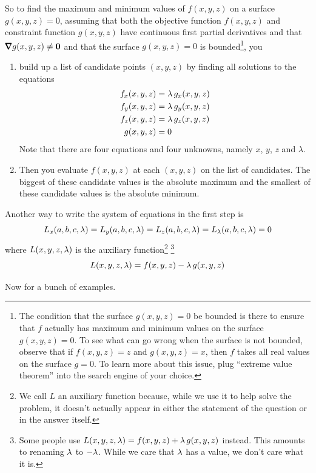 So to find the maximum and minimum values of $f(x,y,z)$ on a surface 
$g(x,y,z)=0$, assuming that both the objective function $f(x,y,z)$ 
and constraint function $g(x,y,z)$ have continuous first partial 
derivatives and that $\vnabla g(x,y,z)\ne\vZero$ and that the surface 
$g(x,y,z)=0$ is bounded\footnote{The condition that the surface $g(x,y,z)=0$ be bounded
is there to ensure that $f$ actually has maximum and minimum values on the surface
$g(x,y,z)=0$. To see what can go wrong when the surface is not bounded, observe that if $f(x,y,z)=z$ and $g(x,y,z)=x$, then $f$ takes all real values on the surface $g=0$. To learn more about this issue, plug ``extreme value theorem'' into the search engine of your choice.}, you
\begin{enumerate}
\item build up a list of candidate points $(x,y,z)$ by finding all 
solutions to the equations
\begin{align*}
f_x(x,y,z) &= \lambda\, g_x(x,y,z)\\
f_y(x,y,z) &= \lambda\, g_y(x,y,z)\\
f_z(x,y,z) &= \lambda\, g_z(x,y,z)\\
g(x,y,z)&=0
\end{align*}
Note that there are four equations and four unknowns, namely $x$, $y$, $z$
and $\lambda$.
\item Then you evaluate $f(x,y,z)$ at each $(x,y,z)$ on the list 
of candidates.
   The biggest of these candidate values is the absolute maximum 
   and the smallest of these candidate values is the absolute minimum.
\end{enumerate}
Another way to write the system of equations in the first step is
\begin{equation*}
L_x(a,b,c,\lambda) = L_y(a,b,c,\lambda) = L_z(a,b,c,\lambda) = L_\lambda(a,b,c,\lambda) = 0
\end{equation*}
where $L(x,y,z,\lambda)$ is the auxiliary function\footnote{We call $L$ an auxiliary function because, while we use it to help solve the problem,
it doesn't actually appear in either the statement of the question or in 
the answer itself.} \footnote{Some people
use $L(x,y,z,\lambda)=f(x,y,z)+\lambda\, g(x,y,z)$ instead. This amounts to renaming
$\lambda$ to $-\lambda$. While we care that $\lambda$ has a value, we don't care what it 
is.}
\begin{equation*}
L(x,y,z,\lambda)=f(x,y,z)-\lambda\, g(x,y,z)
\end{equation*}

Now for a bunch of examples.

